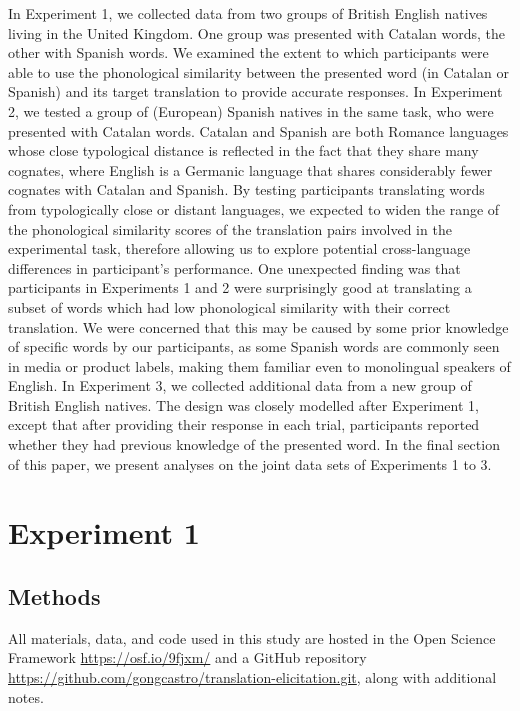 \documentclass[
]{article}
\begin{document}
In Experiment 1, we collected data from two groups of British English
natives living in the United Kingdom. One group was presented with
Catalan words, the other with Spanish words. We examined the extent to
which participants were able to use the phonological similarity between
the presented word (in Catalan or Spanish) and its target translation to
provide accurate responses. In Experiment 2, we tested a group of
(European) Spanish natives in the same task, who were presented with
Catalan words. Catalan and Spanish are both Romance languages whose
close typological distance is reflected in the fact that they share many
cognates, where English is a Germanic language that shares considerably
fewer cognates with Catalan and Spanish. By testing participants
translating words from typologically close or distant languages, we
expected to widen the range of the phonological similarity scores of the
translation pairs involved in the experimental task, therefore allowing
us to explore potential cross-language differences in participant's
performance. One unexpected finding was that participants in Experiments
1 and 2 were surprisingly good at translating a subset of words which
had low phonological similarity with their correct translation. We were
concerned that this may be caused by some prior knowledge of specific
words by our participants, as some Spanish words are commonly seen in
media or product labels, making them familiar even to monolingual
speakers of English. In Experiment 3, we collected additional data from
a new group of British English natives. The design was closely modelled
after Experiment 1, except that after providing their response in each
trial, participants reported whether they had previous knowledge of the
presented word. In the final section of this paper, we present analyses
on the joint data sets of Experiments 1 to 3.

\section{Experiment 1}\label{experiment-1}

\subsection{Methods}\label{methods}

All materials, data, and code used in this study are hosted in the Open
Science Framework
\href{https://osf.io/9fjxm/?view_only=aab7636ce1af48cf832596a7ea9101c5/}{https://osf.io/9fjxm/}
and a GitHub repository
\url{https://github.com/gongcastro/translation-elicitation.git}, along
with additional notes.
\end{document}
